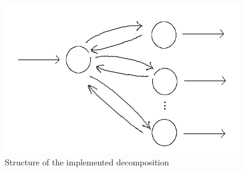\documentclass{article}
\begin{document}
\begin{figure}[h]
\centering
\includegraphics[scale=0.55]{map_no_g}
\caption{Structure of the implemented decomposition}
\label{fig:worker}
\end{figure} 
\end{document}
